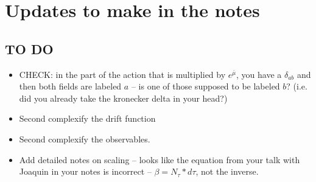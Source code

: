 \documentclass[../RotatingBosons.tex]{subfiles}
\begin{document}
\section{Updates to make in the notes}
\subsection{TO DO}
\begin{itemize}
	\item CHECK: in the part of the action that is multiplied by $e^{\bar{\mu}}$, you have a $\delta_{ab}$ and then both fields are labeled $a$ -- is one of those supposed to be labeled $b$? (i.e. did you already take the kronecker delta in your head?) 
	\item Second complexify the drift function	
	\item Second complexify the observables. 	
	\item Add detailed notes on scaling -- looks like the equation from your talk with Joaquin in your notes is incorrect -- $\beta = N_{\tau}*d\tau$, not the inverse.
\end{itemize}
\end{document}

